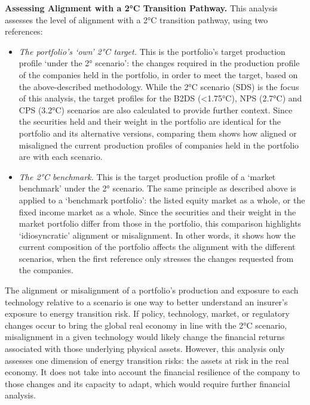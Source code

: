 \documentclass[10pt,table,a4]{article}\usepackage[]{graphicx}\usepackage[]{color}
\begin{document}
	\begin{multicols}{2}
		
		
		\textbf{Assessing Alignment with a 2°C Transition Pathway. }This analysis assesses the level of alignment with a 2°C transition pathway, using two references:
		
		\begin{itemize}
			\item{\textit{The portfolio's `own' 2°C target.} This is the portfolio's target production profile `under the 2° scenario': the changes required in the production profile of the companies held in the portfolio, in order to meet the target, based on the above-described methodology. While the 2°C scenario (SDS) is the focus of this analysis, the target profiles for the B2DS (<1.75°C), NPS (2.7°C) and CPS (3.2°C) scenarios are also calculated to provide further context. Since the securities held and their weight in the portfolio are identical for the portfolio and its alternative versions, comparing them shows how aligned or misaligned the current production profiles of companies held in the portfolio are with each scenario.}
			
			\item{\textit{The 2°C benchmark. }This is the target production profile of a `market benchmark' under the 2° scenario. The same principle as described above is applied to a `benchmark portfolio': the listed equity market as a whole, or the fixed income market as a whole. Since the securities and their weight in the market portfolio differ from those in the portfolio, this comparison highlights `idiosyncratic' alignment or misalignment. In other words, it shows how the current composition of the portfolio affects the alignment with the different scenarios, when the first reference only stresses the changes requested from the companies.}
		\end{itemize}
		
		
		The alignment or misalignment of a portfolio's production and exposure to each technology relative to a scenario is one way to better understand an insurer's exposure to energy transition risk. If policy, technology, market, or regulatory changes occur to bring the global real economy in line with the 2°C scenario, misalignment in a given technology would likely change the financial returns associated with those underlying physical assets. However, this analysis only assesses one dimension of energy transition risks: the assets at risk in the real economy. It does not take into account the financial resilience of the company to those changes and its capacity to adapt, which would require further financial analysis.
		

\end{multicols}
\end{document}
